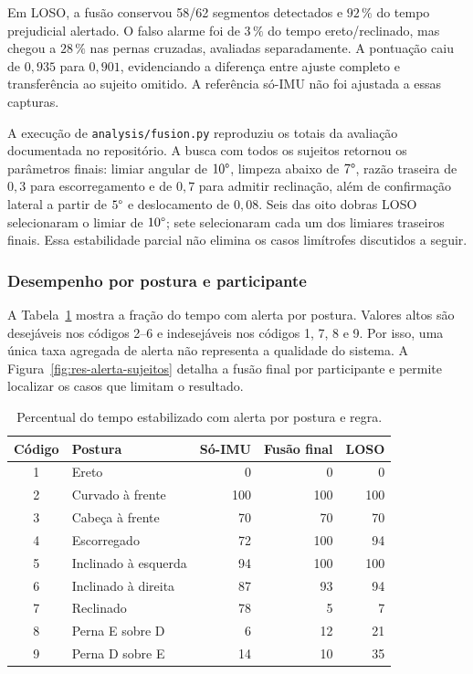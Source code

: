 Em LOSO, a fusão conservou 58/62 segmentos detectados e $92\,\%$ do tempo
prejudicial alertado. O falso alarme foi de $3\,\%$ do tempo ereto/reclinado,
mas chegou a $28\,\%$ nas pernas cruzadas, avaliadas separadamente.
A pontuação caiu de $0{,}935$ para $0{,}901$, evidenciando a diferença entre
ajuste completo e transferência ao sujeito omitido. A referência só-IMU
não foi ajustada a essas capturas.

A execução de \texttt{analysis/fusion.py} reproduziu os totais da avaliação
documentada no repositório. A busca com todos os sujeitos retornou os
parâmetros finais: limiar angular de $10\degree{}$, limpeza abaixo de
$7\degree{}$, razão traseira de $0{,}3$ para escorregamento e de $0{,}7$
para admitir reclinação, além de confirmação lateral a partir de
$5\degree{}$ e deslocamento de $0{,}08$. Seis das oito dobras LOSO
selecionaram o limiar de $10\degree{}$; sete selecionaram cada um dos
limiares traseiros finais. Essa estabilidade parcial não elimina os casos
limítrofes discutidos a seguir.

\subsubsection{Desempenho por postura e participante}

A Tabela~\ref{tab:res-alerta-postura} mostra a fração do tempo com alerta por
postura. Valores altos são desejáveis nos códigos 2--6 e indesejáveis nos
códigos 1, 7, 8 e 9. Por isso, uma única taxa agregada de alerta não representa
a qualidade do sistema. A Figura~\ref{fig:res-alerta-sujeitos} detalha a fusão
final por participante e permite localizar os casos que limitam o resultado.

\begin{table}[H]
  \centering
  \caption{Percentual do tempo estabilizado com alerta por postura e regra.}
  \label{tab:res-alerta-postura}
  \begin{singlespace}
  \begin{tabularx}{\linewidth}{cXrrr}
    \toprule
    Código & Postura & Só-IMU & Fusão final & LOSO \\
    \midrule
    1 & Ereto                & 0 & 0 & 0 \\
    2 & Curvado à frente     & 100 & 100 & 100 \\
    3 & Cabeça à frente      & 70 & 70 & 70 \\
    4 & Escorregado          & 72 & 100 & 94 \\
    5 & Inclinado à esquerda & 94 & 100 & 100 \\
    6 & Inclinado à direita  & 87 & 93 & 94 \\
    7 & Reclinado            & 78 & 5 & 7 \\
    8 & Perna E sobre D      & 6 & 12 & 21 \\
    9 & Perna D sobre E      & 14 & 10 & 35 \\
    \bottomrule
  \end{tabularx}
  \end{singlespace}
\end{table}

